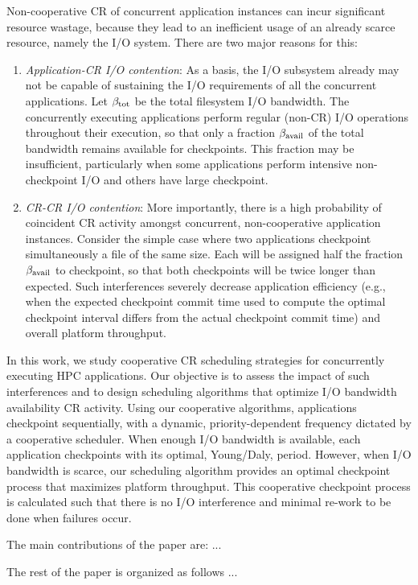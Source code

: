Non-cooperative CR of concurrent application instances can incur significant resource
wastage, because they lead to an inefficient usage of an already scarce resource,
namely the I/O system.  There are two major reasons for this:
\begin{enumerate}
\item \emph{Application-CR I/O contention}: As a basis, the I/O subsystem already may
  not be capable of sustaining the I/O requirements of all the concurrent
  applications.  Let $\beta_{\text{tot}}$ be the total filesystem I/O bandwidth.  The
  concurrently executing applications perform regular (non-CR) I/O operations
  throughout their execution, so that only a fraction $\beta_{\text{avail}}$ of the total
  bandwidth remains available for checkpoints.  This fraction may be insufficient,
  particularly when some applications perform intensive non-checkpoint I/O and others
  have large checkpoint.

\item \emph{CR-CR I/O contention}: More importantly, there is a high probability of
  coincident CR activity amongst concurrent, non-cooperative application instances.
  Consider the simple case where two applications checkpoint simultaneously a file of
  the same size. Each will be assigned half the fraction $\beta_{\text{avail}}$ to checkpoint,
  so that both checkpoints will be twice longer than expected. Such interferences
  severely decrease application efficiency (e.g., when the expected checkpoint commit
  time used to compute the optimal checkpoint interval differs from the actual
  checkpoint commit time) and overall platform throughput.
\end{enumerate}

In this work, we study cooperative CR scheduling strategies for concurrently
executing HPC applications.  Our objective is to assess the impact of such
interferences and to design scheduling algorithms that optimize I/O bandwidth
availability CR activity.  Using our cooperative algorithms, applications checkpoint
sequentially, with a dynamic, priority-dependent frequency dictated by a cooperative
scheduler.  When enough I/O bandwidth is available, each application checkpoints with
its optimal, Young/Daly, period. However, when I/O bandwidth is scarce, our
scheduling algorithm provides an optimal checkpoint process that maximizes platform
throughput. This cooperative checkpoint process is calculated such that there is no
I/O interference and minimal re-work to be done when failures occur.

The main contributions of the paper are: ...

The rest of the paper is organized as follows ...